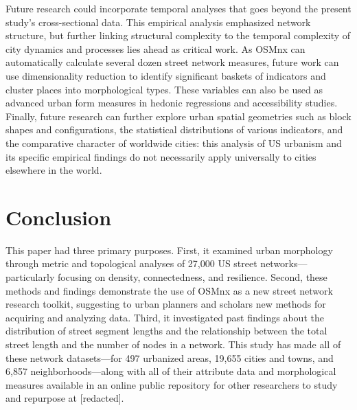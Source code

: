 \documentclass[Afour,sageh,times]{sagej}
\begin{document}
Future research could incorporate temporal analyses that goes beyond the present study's cross-sectional data. This empirical analysis emphasized network structure, but further linking structural complexity to the temporal complexity of city dynamics and processes lies ahead as critical work. As OSMnx can automatically calculate several dozen street network measures, future work can use dimensionality reduction to identify significant baskets of indicators and cluster places into morphological types. These variables can also be used as advanced urban form measures in hedonic regressions and accessibility studies. Finally, future research can further explore urban spatial geometries such as block shapes and configurations, the statistical distributions of various indicators, and the comparative character of worldwide cities: this analysis of US urbanism and its specific empirical findings do not necessarily apply universally to cities elsewhere in the world.

\section{Conclusion}

This paper had three primary purposes. First, it examined urban morphology through metric and topological analyses of 27,000 US street networks---particularly focusing on density, connectedness, and resilience. Second, these methods and findings demonstrate the use of OSMnx as a new street network research toolkit, suggesting to urban planners and scholars new methods for acquiring and analyzing data. Third, it investigated past findings about the distribution of street segment lengths and the relationship between the total street length and the number of nodes in a network. This study has made all of these network datasets---for 497 urbanized areas, 19,655 cities and towns, and 6,857 neighborhoods---along with all of their attribute data and morphological measures available in an online public repository for other researchers to study and repurpose at [redacted].
\end{document}
